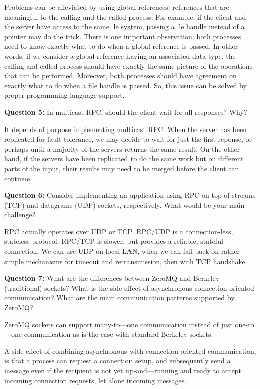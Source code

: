 \documentclass[12pt,a4paper]{report}
\begin{document}
Problems can be alleviated by using global references: references that are meaningful to the calling and the called process. For example, if the client and the server have access to the same le system, passing a le handle instead of a pointer may do the trick. There is one important observation: both processes need to know exactly what to do when a global reference is passed. In other words, if we consider a global reference having an associated data type, the calling and called process should have exactly the same picture of the operations that can be performed. Moreover, both processes should have agreement on exactly what to do when a file handle is passed. So, this issue can be solved by proper programming-language support.

\bigbreak

\textbf{Question 5:} In multicast RPC, should the client wait for all responses? Why?

It depends of purpose implementing multicast RPC. When the server has been replicated for fault tolerance, we may decide to wait for just the first reponse, or perhaps until a majority of the servers returns the same result. On the other hand, if the servers have been replicated to do the same work but on different parts of the input, their results may need to be merged before the client can continue.

\bigbreak

\textbf{Question 6:} Consider implementing an application using RPC on top of streams (TCP) and datagrams (UDP) sockets, respectively. What would be your main challenge?

RPC actually operates over UDP or TCP. RPC/UDP is a connection-less, stateless protocol. RPC/TCP is slower, but provides a reliable, stateful connection. We can use UDP on local LAN, when we can fall back on rather simple mechanisms for timeout and retransmission, then with TCP handshake. 

\bigbreak

\textbf{Question 7:} What are the differences between ZeroMQ and Berkeley (traditional) sockets? What is the side effect of asynchronous connection-oriented communication? What are the main communication patterns supported by ZeroMQ?

ZeroMQ sockets can support many-to—one communication instead of just one-to—one communication as is the case with standard Berkeley sockets.

A side effect of combining asynchronous with connection-oriented communication, is that a process can request a connection setup, and subsequently send a message even if the recipient is not yet up-and—running and ready to accept incoming connection requests, let alone incoming messages.
\end{document}
